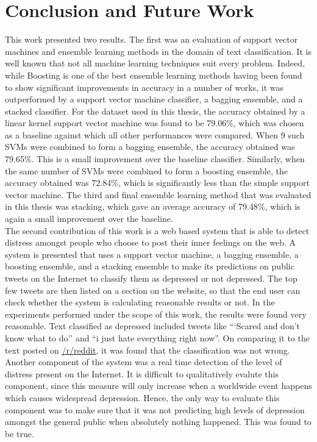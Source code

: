 \chapter{Conclusion and Future Work}
\label{chapter:Conclusion}

This work presented two results. The first was an evaluation of support vector machines and ensemble learning methods in the domain of text classification. It is well known that not all machine learning techniques suit every problem. Indeed, while Boosting is one of the best ensemble learning methods having been found to show significant improvements in accuracy in a number of works, it was outperformed by a support vector machine classifier, a bagging ensemble, and a stacked classifier. For the dataset used in this thesis, the accuracy obtained by a linear kernel support vector machine was found to be 79.06\%, which was chosen as a baseline against which all other performances were compared. When 9 such SVMs were combined to form a bagging ensemble, the accuracy obtained was 79.65\%. This is a small improvement over the baseline classifier. Similarly, when the same number of SVMs were combined to form a boosting ensemble, the accuracy obtained was 72.84\%, which is significantly less than the simple support vector machine. The third and final ensemble learning method that was evaluated in this thesis was stacking, which gave an average accuracy of 79.48\%, which is again a small improvement over the baseline.\\

The second contribution of this work is a web based system that is able to detect distress amongst people who choose to post their inner feelings on the web. A system is presented that uses a support vector machine, a bagging ensemble, a boosting ensemble, and a stacking ensemble to make its predictions on public tweets on the Internet to classify them as depressed or not depressed. The top few tweets are then listed on a section on the website, so that the end user can check whether the system is calculating reasonable results or not. In the experiments performed under the scope of this work, the results were found very reasonable. Text classified as depressed included tweets like ```Scared and don't know what to do'' and ``i just hate everything right now''. On comparing it to the text posted on \href{http://www.reddit.com/r/suicidewatch}{/r/reddit}, it was found that the classification was not wrong. Another component of the system was a real time detection of the level of distress present on the Internet. It is difficult to qualitatively evalute this component, since this measure will only increase when a worldwide event happens which causes widespread depression. Hence, the only way to evaluate this component was to make sure that it was not predicting high levels of depression amongst the general public when absolutely nothing happened. This was found to be true.\\

